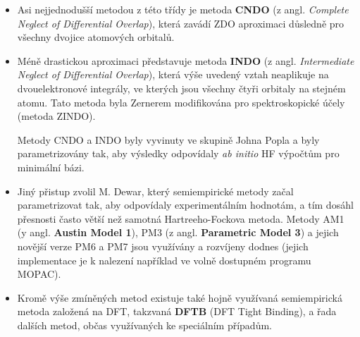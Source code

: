 \begin{itemize}
\item Asi nejjednodušší metodou z této třídy je metoda \textbf{CNDO} (z angl. \textit{Complete Neglect of Differential Overlap}), která zavádí ZDO aproximaci důsledně pro všechny dvojice atomových orbitalů.

\item Méně drastickou aproximaci představuje metoda \textbf{INDO} (z angl. \textit{Intermediate Neglect of Differential Overlap}), která výše uvedený vztah neaplikuje na dvouelektronové integrály, ve kterých jsou všechny čtyři orbitaly na stejném atomu. Tato metoda byla Zernerem modifikována pro spektroskopické účely (metoda ZINDO).

Metody CNDO a INDO byly vyvinuty ve skupině Johna Popla a byly parametrizovány tak, aby výsledky odpovídaly \textit{ab initio} HF výpočtům pro minimální bázi. 

\item Jiný přistup zvolil M. Dewar, který semiempirické metody začal parametrizovat tak, aby odpovídaly experimentálním hodnotám, a tím dosáhl přesnosti často větší než samotná Hartreeho-Fockova metoda. Metody AM1 (y angl. \textbf{Austin Model 1}), PM3 (z angl. \textbf{Parametric Model 3}) a jejich novější verze PM6 a PM7 jsou využívány a rozvíjeny dodnes (jejich implementace je k nalezení například ve volně dostupném programu MOPAC).

\item Kromě výše zmíněných metod existuje také hojně využívaná semiempirická metoda založená na DFT, takzvaná \textbf{DFTB} (DFT Tight Binding), a řada dalších metod, občas využívaných ke speciálním případům.

\end{itemize}
 
